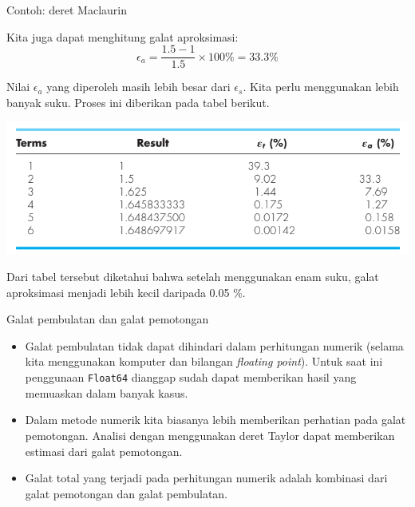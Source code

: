 \begin{frame}[fragile]{Contoh: deret Maclaurin}
\fontsize{9}{10}\selectfont

Kita juga dapat menghitung galat aproksimasi:
$$
\epsilon_{a} = \frac{1.5 - 1}{1.5} \times 100\% = 33.3 \% 
$$

Nilai $\epsilon_a$ yang diperoleh masih lebih besar dari $\epsilon_s$. Kita
perlu menggunakan lebih banyak suku. Proses ini diberikan pada tabel berikut.

{\centering
\includegraphics[height=0.4\textheight]{../chapra_7th/Chapra_Table_Example_3_2.png}
\par}

Dari tabel tersebut diketahui bahwa setelah menggunakan enam suku, galat aproksimasi
menjadi lebih kecil daripada 0.05 \%.


\end{frame}








\begin{frame}{Galat pembulatan dan galat pemotongan}

\begin{itemize}
\item Galat pembulatan tidak dapat dihindari dalam perhitungan numerik (selama
kita menggunakan komputer dan bilangan \textit{floating point}). Untuk saat ini
penggunaan \texttt{Float64} dianggap sudah dapat memberikan hasil yang memuaskan
dalam banyak kasus.
\item Dalam metode numerik kita biasanya lebih memberikan perhatian pada galat
pemotongan. Analisi dengan menggunakan deret Taylor dapat memberikan
estimasi dari galat pemotongan.
\item Galat total yang terjadi pada perhitungan numerik adalah kombinasi
dari galat pemotongan dan galat pembulatan.
\end{itemize}

\end{frame}


